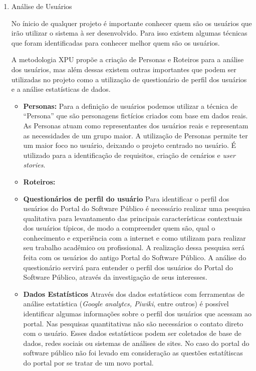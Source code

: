 \begin{enumerate}


\item Análise de Usuários
	
	No ínicio de qualquer projeto é importante conhecer quem são os usuários que irão utilizar o sistema à ser desenvolvido. Para isso existem algumas técnicas que foram identificadas para conhecer melhor quem são os usuários.
	
	A metodologia XPU propõe a criação de Personas e Roteiros para a análise dos usuários, mas além dessas existem outras importantes que podem ser utilizadas no projeto como a utilização de questionário de perfil dos usuários e a análise estatísticas de dados.
	
	\begin{itemize}
		\item \textbf{Personas:} Para a definição de usuários podemos utilizar a técnica de “Persona” que são personagens fictícios criados com base em dados reais. As Personas atuam como representantes dos usuários reais e representam as necessidades de um grupo maior. 
%
A utilização de Personas permite ter um maior foco no usuário, deixando o projeto centrado no usuário. É utilizado para a identificação de requisitos, criação de cenários e \textit{user stories}. 
		\item \textbf{Roteiros:}		
		
		\item \textbf{Questionários de perfil do usuário} Para identificar o perfil dos usuários do Portal do Software Público é necessário realizar uma pesquisa qualitativa para levantamento das principais características contextuais dos usuários típicos, de modo a compreender quem são, qual o conhecimento e experiência com a internet e como utilizam para realizar seu trabalho acadêmico ou profissional. A realização dessa pesquisa será feita com os usuários do antigo Portal do Software Público.
%
A análise do questionário servirá para entender o perfil dos usuários do Portal do Software Público, através da investigação de seus interesses. 

\item \textbf{Dados Estatísticos} Através dos dados estatísticos com ferramentas de análise estatística (\textit{Google analytcs, Piwiki}, entre outros) é possível identificar algumas informações sobre o perfil dos usuários que acessam ao portal. Nas pesquisas quantitativas não são necessários o contato direto com o usuário. Esses dados estatísticos podem ser coletados de base de dados, redes sociais ou sistemas de análises de sites. No caso do portal do software público não foi levado em consideração as questões estatítiscas do portal por se tratar de um novo portal. %


\end{itemize}
\end{enumerate}
